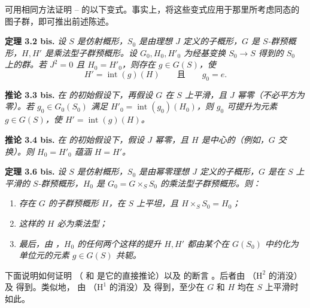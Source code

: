 可用相同方法证明 -- 的以下变式。事实上，将这些变式应用于那里所考虑同态的图子群，即可推出前述陈述。

\medskip
\noindent{}\textbf{定理 3.2 bis.}
\textit{设 \(S\) 是仿射概形，\(S_0\) 是由理想 \(J\) 定义的子概形，\(G\) 是 \(S\)-群预概形，\(H,H'\) 是乘法型子群预概形。设 \(G_0,H_0,H'_0\) 为经基变换 \(S_0\to S\) 得到的 \(S_0\) 上的群。若 \(J^2=0\) 且 \(H_0=H'_0\)，则存在 \(g\in G(S)\)，使}
\[
  H'=\operatorname{int}(g)(H)
  \qquad\textit{且}\qquad
  g_0=e.
\]

\medskip
\noindent{}\textbf{推论 3.3 bis.}
\textit{在  的初始假设下，再假设 \(G\) 在 \(S\) 上平滑，且 \(J\) 幂零（不必平方为零）。若 \(g_0\in G_0(S_0)\) 满足 \(H'_0=\operatorname{int}(g_0)(H_0)\)，则 \(g_0\) 可提升为元素 \(g\in G(S)\)，使 \(H'=\operatorname{int}(g)(H)\)。}

\medskip
\noindent{}\textbf{推论 3.4 bis.}
\textit{在  的初始假设下，假设 \(J\) 幂零，且 \(H\) 是中心的（例如，\(G\) 交换）。则 \(H_0=H'_0\) 蕴涵 \(H=H'\)。}

\medskip
\noindent{}\textbf{定理 3.6 bis.}
\textit{设 \(S\) 是仿射概形，\(S_0\) 是由幂零理想 \(J\) 定义的子概形，\(G\) 是在 \(S\) 上平滑的 \(S\)-群预概形，\(H_0\) 是 \(G_0=G\times_SS_0\) 的乘法型子群预概形。则：}
\begin{enumerate}
  \item[(a)]
  \textit{存在 \(G\) 的子群预概形 \(H\)，在 \(S\) 上平坦，且 \(H\times_SS_0=H_0\)；}

  \item[\SGAInlineRefTarget{sga3:ix:theorem:3:2:item:b}(b)]
  \textit{这样的 \(H\) 必为乘法型；}

  \item[(c)]
  \textit{最后，由 ，\(H_0\) 的任何两个这样的提升 \(H,H'\) 都由某个在 \(G(S_0)\) 中约化为单位元的元素 \(g\in G(S)\) 共轭。}
\end{enumerate}

下面说明如何证明 （ 和  是它的直接推论）以及  的断言 。后者由 （\(\mathrm H^2\) 的消没）及  得到。类似地， 由 （\(\mathrm H^1\) 的消没）及  得到，至少在 \(G\) 和 \(H\) 均在 \(S\) 上平滑时如此。

